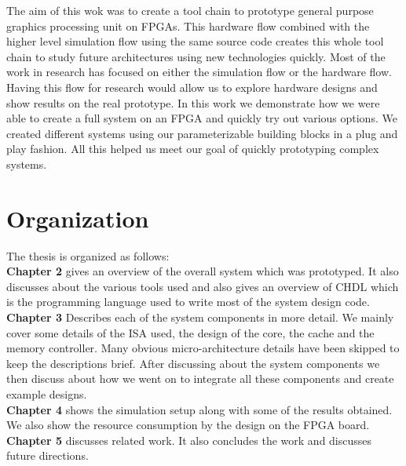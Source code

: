 The aim of this wok was to create a tool chain to prototype general purpose graphics processing unit on FPGAs. This hardware flow combined with the higher level simulation flow using the same source code creates this whole tool chain to study future architectures using new technologies quickly. Most of the work in research has focused on either the simulation flow or the hardware flow. Having this flow for research would allow us to explore hardware designs and show results on the real prototype. %
In this work we demonstrate how we were able to create a full system on an FPGA and quickly try out various options. We created different systems using our parameterizable building blocks in a plug and play fashion. All this helped us meet our goal of quickly prototyping complex systems.

\section{Organization}
The thesis is organized as follows:
\\ 
\noindent\textbf{Chapter 2} gives an overview of the overall system which was prototyped. It also discusses about the various tools used and also gives an overview of CHDL which is the programming language used to write most of the system design code.
\\
\noindent\textbf{Chapter 3} Describes each of the system components in more detail. We mainly cover some details of the ISA used, the design of the core, the cache and the memory controller. Many obvious micro-architecture details have been skipped to keep the descriptions brief. After discussing about the system components we then discuss about how we went on to integrate all these components and create example designs.
\\
\noindent\textbf{Chapter 4} shows the simulation setup along with some of the results obtained. We also show the resource consumption by the design on the FPGA board.
\\
\noindent\textbf{Chapter 5} discusses related work. It also concludes the work and discusses future directions. 

